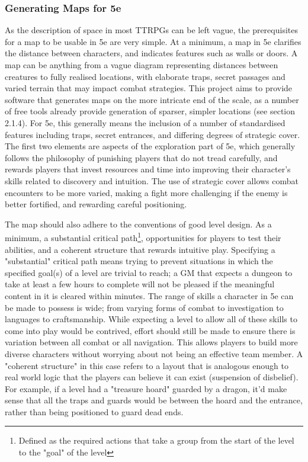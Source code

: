 \documentclass{article}
\begin{document}
\subsubsection{Generating Maps for 5e}
As the description of space in most TTRPGs can be left vague, the prerequisites for a map to be usable in 5e are very simple. At a minimum, a map in 5e clarifies the distance between characters, and indicates features such as walls or doors. A map can be anything from a vague diagram representing distances between creatures to fully realised locations, with elaborate traps, secret passages and varied terrain that may impact combat strategies. This project aims to provide software that generates maps on the more intricate end of the scale, as a number of free tools already provide generation of sparser, simpler locations (see section 2.1.4). 
For 5e, this generally means the inclusion of a number of standardised features including traps, secret entrances, and differing degrees of strategic cover. 
The first two elements are aspects of the exploration part of 5e, which generally follows the philosophy of punishing players that do not tread carefully, and rewards players that invest resources and time into improving their character's skills related to discovery and intuition. The use of strategic cover allows combat encounters to be more varied, making a fight more challenging if the enemy is better fortified, and rewarding careful positioning.

The map should also adhere to the conventions of good level design. As a minimum, a substantial critical path\footnote{Defined as the required actions that take a group from the start of the level to the "goal" of the level}, opportunities for players to test their abilities, and a coherent structure that rewards intuitive play.
Specifying a "substantial" critical path means trying to prevent situations in which the specified goal(s) of a level are trivial to reach; a GM that expects a dungeon to take at least a few hours to complete will not be pleased if the meaningful content in it is cleared within minutes.
The range of skills a character in 5e can be made to possess is wide; from varying forms of combat to investigation to languages to craftsmanship. While expecting a level to allow all of these skills to come into play would be contrived, effort should still be made to ensure there is variation between all combat or all navigation. This allows players to build more diverse characters without worrying about not being an effective team member.
A "coherent structure" in this case refers to a layout that is analogous enough to real world logic that the players can believe it can exist (suspension of disbelief).
For example, if a level had a "treasure hoard" guarded by a dragon, it'd make sense that all the traps and guards would be between the hoard and the entrance, rather than being positioned to guard dead ends.
\end{document}
